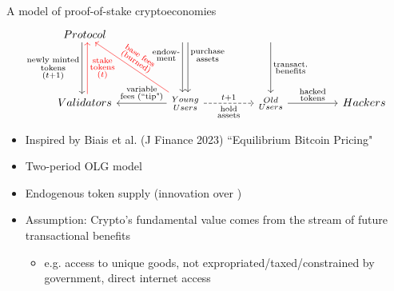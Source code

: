 \documentclass{beamer}
\begin{document}
\begin{frame}{A model of proof-of-stake cryptoeconomies}
    \[
\begin{tikzcd}[ampersand replacement=\&, column sep = 4.5em, row sep = 4.5em]
Protocol 
\ar[d, shift right, "\substack{\text{newly minted}\\\text{tokens}\\(t+1)}" ']
\&
\ar[d, shift right, "\substack{\text{endow-}\\\text{ment}}" 'near start]
\ar[d, shift left, "\substack{\text{purchase}\\ \text{assets}}" near start]
\&
\ar[d, "\substack{\text{transact.}\\ \text{benefits}}" ]
\&
\\
Validators
\ar[u, shift right, red, "\substack{\text{stake}\\\text{tokens}\\(t)}" ' red ]
\& 
\substack{Young\\Users}
\ar[l,"\substack{\text{variable}\\ \text{fees (``tip")}}" ']
\ar[lu, red, "\substack{\text{base fees}\\ \text{(burned)}}" {sloped,auto}' red]
\ar[r, dashed, "t+1", 
"\substack{\text{hold}\\\text{assets}}" ']
\& 
\substack{Old\\Users}
\ar[r, "\substack{\text{hacked}\\ \text{tokens}}"]
\&
Hackers
\end{tikzcd}
\]

\begin{itemize}
    \item Inspired by Biais et al. (J Finance 2023) ``Equilibrium Bitcoin Pricing"
    \item Two-period OLG model
    \item Endogenous token supply (innovation over \citet{biais2023equilibrium})
    \item Assumption: Crypto's fundamental value comes from the stream of future transactional benefits\\
    \begin{itemize}
        \item e.g. access to unique goods, not expropriated/taxed/constrained by government, direct internet access
    \end{itemize}
\end{itemize}

\end{frame}
\end{document}
